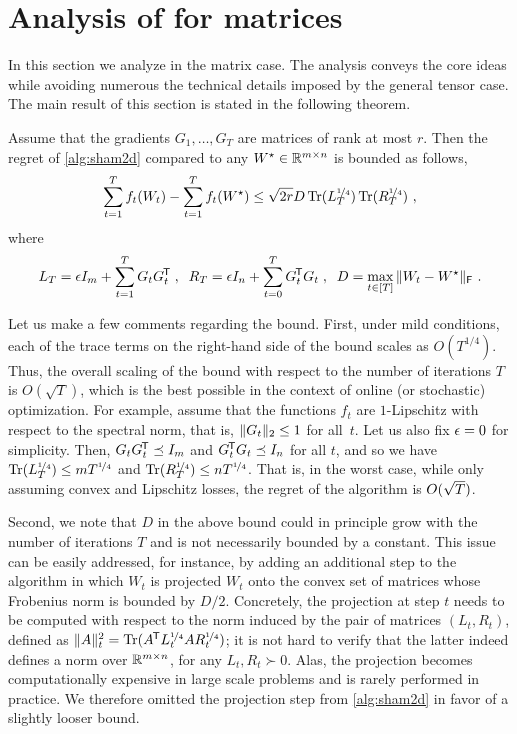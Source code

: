\section{Analysis of \NAME for matrices}
%
In this section we analyze \NAME in the matrix case. The analysis
conveys the core ideas while avoiding numerous the technical details
imposed by the general tensor case. The main result of this section
is stated in the following theorem.

\begin{theorem} \label{thm:regret-2d}
Assume that the gradients $G_1,\ldots,G_T$ are matrices of
rank at most $r$.
Then the regret of \cref{alg:sham2d} compared to any
$W^\star \in \mathbb{R}^{m \times n}$ is bounded as follows,
\begin{align*}
\sum_{t=1}^T f_t(W_t) - \sum_{t=1}^T f_t(W^\star)
\le
\sqrt{2r}D \operatorname*{Tr}(L_T^{{\smash{\nicefrac{1}{4}}}}) \operatorname*{Tr}(R_T^{{\smash{\nicefrac{1}{4}}}})
~,
\end{align*}
where
$$L_T = \epsilon I_m + \sum_{t=1}^T G_t G_t^{\mkern-1.5mu\scriptstyle\mathsf{T}} \;,\;\;
  R_T = \epsilon I_n + \sum_{t=0}^T G_t^{\mkern-1.5mu\scriptstyle\mathsf{T}} G_t \;,\;\;
  D = \max_{t \in [T]} \|W_t-W^\star\|_{\mathsf{F}} ~.$$
\end{theorem}

Let us make a few comments regarding the bound.  First, under mild
conditions, each of the trace terms on the right-hand side of the bound
scales as $O(T^{1/4})$. Thus, the overall scaling of the bound with respect to the number of iterations $T$ is $O(\sqrt{T})$,
which is the best possible in the context of online (or stochastic)
optimization.
%
For example, assume that the functions $f_t$ are $1$-Lipschitz with respect
to the spectral norm, that is, $\|G_t\|_2 \le 1$ for all~$t$. Let us also
fix $\epsilon=0$ for simplicity. Then, $G_t G_t^{\mkern-1.5mu\scriptstyle\mathsf{T}} \preceq I_m$ and $G_t^{\mkern-1.5mu\scriptstyle\mathsf{T}} G_t
\preceq I_n$ for all $t$, and so we have $\operatorname*{Tr}(L_T^{{\smash{\nicefrac{1}{4}}}}) \le
mT^{{\smash{\nicefrac{1}{4}}}}$ and $\operatorname*{Tr}(R_T^{{\smash{\nicefrac{1}{4}}}}) \le nT^{{\smash{\nicefrac{1}{4}}}}$.  That is, in the
worst case, while only assuming convex and Lipschitz losses, the regret of
the algorithm is $O(\sqrt{T})$.

Second, we note that $D$ in the above bound could in principle grow with the
number of iterations $T$ and is not necessarily bounded by a constant. This
issue can be easily addressed, for instance, by adding an additional step to the algorithm
in which $W_t$ is projected $W_t$ onto the convex set of matrices whose
Frobenius norm is bounded by $D/2$. 
Concretely, the projection at step $t$ needs to be computed with respect to
the norm induced by the pair of matrices $(L_t,R_t)$, defined as
$\|A\|_t^2 = \operatorname*{Tr}(A^{\mkern-1.5mu\scriptstyle\mathsf{T}} L_t^{{\smash{\nicefrac{1}{4}}}}AR_t^{{\smash{\nicefrac{1}{4}}}})$;
it is not hard to verify that the latter indeed defines a norm over
$\mathbb{R}^{m \times n}$, for any $L_t,R_t \succ 0$. Alas, the projection becomes
computationally expensive in large scale problems and is rarely performed in
practice. We therefore omitted the projection step from \cref{alg:sham2d} in
favor of a slightly looser bound.

